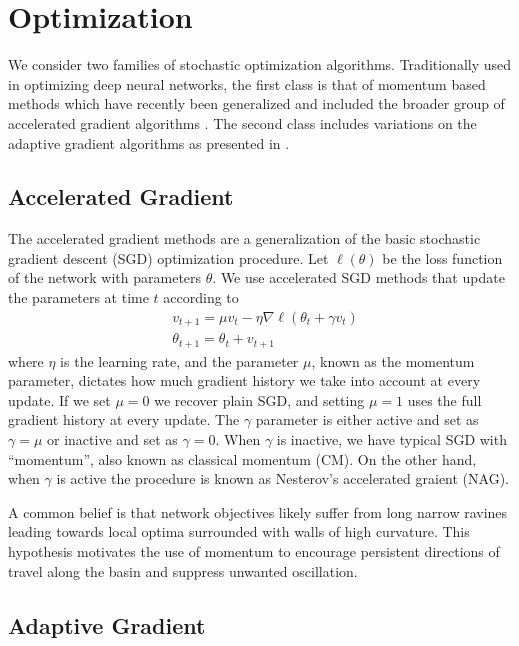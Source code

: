 \section{Optimization}

We consider two families of stochastic optimization algorithms. Traditionally
used in optimizing deep neural networks, the first class is that of momentum
based methods which have recently been generalized and included the broader
group of accelerated gradient algorithms \cite{sutskever_2013}. The second class
includes variations on the adaptive gradient algorithms as presented in
\cite{duchi_2011}.

\subsection{Accelerated Gradient}

The accelerated gradient methods are a generalization of the basic stochastic
gradient descent (SGD) optimization procedure. Let $\ell(\theta)$ be the loss
function of the network with parameters $\theta$. We use accelerated SGD
methods that update the parameters at time $t$ according to
\begin{equation}
\label{nag}
\begin{aligned}
&v_{t+1} = \mu v_t - \eta \nabla \ell (\theta_t + \gamma v_t) \\
&\theta_{t+1} = \theta_t + v_{t+1}
\end{aligned}
\end{equation}
where $\eta$ is the learning rate, and the parameter $\mu$, known as the
momentum parameter, dictates how much gradient history we take into account at
every update. If we set $\mu = 0$ we recover plain SGD, and setting $\mu = 1$
uses the full gradient history at every update.  The $\gamma$ parameter is
either active and set as $\gamma = \mu$ or inactive and set as $\gamma = 0$.
When $\gamma$ is inactive, we have typical SGD with ``momentum'', also known as
classical momentum (CM). On the other hand, when $\gamma$ is active the
procedure is known as Nesterov's accelerated graient (NAG).

A common belief is that network objectives likely suffer from long narrow
ravines leading towards local optima surrounded with walls of high curvature.
This hypothesis motivates the use of momentum to encourage persistent
directions of travel along the basin and suppress unwanted oscillation.

\subsection{Adaptive Gradient}
\label{adagrad}


